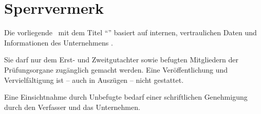 \chapter*{Sperrvermerk}
\thispagestyle{empty}
Die vorliegende \myworktype ~mit dem Titel \enquote{\emph{{\mytitle}}} basiert auf internen, vertraulichen Daten und Informationen des Unternehmens \mydualpartner.

Sie darf nur dem Erst- und Zweitgutachter sowie befugten Mitgliedern der Prüfungsorgane zugänglich gemacht werden. Eine Veröffentlichung und Vervielfältigung ist -- auch in Auszügen -- nicht gestattet.

Eine Einsichtnahme durch Unbefugte bedarf einer schriftlichen Genehmigung durch den Verfasser und das Unternehmen.

\newpage